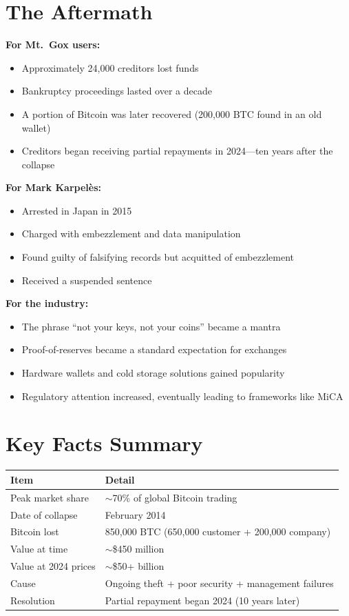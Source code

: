 \documentclass[11pt]{article}
\begin{document}
\section*{The Aftermath}

\textbf{For Mt.\ Gox users:}
\begin{itemize}[leftmargin=*]
\item Approximately 24,000 creditors lost funds
\item Bankruptcy proceedings lasted over a decade
\item A portion of Bitcoin was later recovered (200,000 BTC found in an old wallet)
\item Creditors began receiving partial repayments in 2024---ten years after the collapse
\end{itemize}

\medskip
\noindent\textbf{For Mark Karpelès:}
\begin{itemize}[leftmargin=*]
\item Arrested in Japan in 2015
\item Charged with embezzlement and data manipulation
\item Found guilty of falsifying records but acquitted of embezzlement
\item Received a suspended sentence
\end{itemize}

\medskip
\noindent\textbf{For the industry:}
\begin{itemize}[leftmargin=*]
\item The phrase ``not your keys, not your coins'' became a mantra
\item Proof-of-reserves became a standard expectation for exchanges
\item Hardware wallets and cold storage solutions gained popularity
\item Regulatory attention increased, eventually leading to frameworks like MiCA
\end{itemize}

\section*{Key Facts Summary}

\begin{center}
\begin{tabular}{ll}
\toprule
\textbf{Item} & \textbf{Detail} \\
\midrule
Peak market share & $\sim$70\% of global Bitcoin trading \\
Date of collapse & February 2014 \\
Bitcoin lost & 850,000 BTC (650,000 customer + 200,000 company) \\
Value at time & $\sim$\$450 million \\
Value at 2024 prices & $\sim$\$50+ billion \\
Cause & Ongoing theft + poor security + management failures \\
Resolution & Partial repayment began 2024 (10 years later) \\
\bottomrule
\end{tabular}
\end{center}
\end{document}
